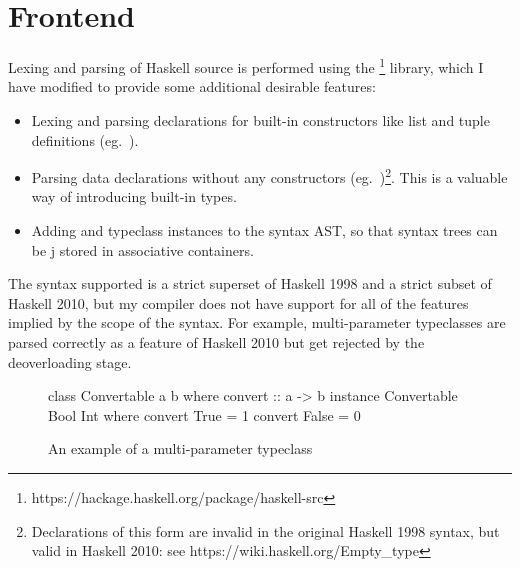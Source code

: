 \documentclass[dissertation.tex]{subfiles}
\begin{document}
\section{Frontend}
{

    Lexing and parsing of Haskell source is performed using the
    \footnote{https://hackage.haskell.org/package/haskell-src} library, which I have modified to
    provide some additional desirable features:

    \begin{itemize}
    \item
    {
        Lexing and parsing declarations for built-in constructors like list and tuple definitions (eg.\ ).
    }
    \item
    {

        Parsing data declarations without any constructors (eg.\ )\footnote{Declarations of this form
        are invalid in the original Haskell 1998 syntax, but valid in Haskell 2010: see
        https://wiki.haskell.org/Empty\_type}. This is a valuable way of introducing built-in types.

    }
    \item
    {

        Adding  and  typeclass instances to the syntax AST, so that syntax trees can be
j       stored in associative containers.

    }
    \end{itemize}

    The syntax supported is a strict superset of Haskell 1998 and a strict subset of Haskell 2010, but my compiler does
    not have support for all of the features implied by the scope of the syntax. For example, multi-parameter
    typeclasses are parsed correctly as a feature of Haskell 2010 but get rejected by the deoverloading stage.

    \begin{figure}[h]
        \begin{haskellfigure}
        class Convertable a b where
            convert :: a -> b
        instance Convertable Bool Int where
            convert True = 1
            convert False = 0
        \end{haskellfigure}
        \caption{An example of a multi-parameter typeclass}
    \end{figure}

}
\end{document}

